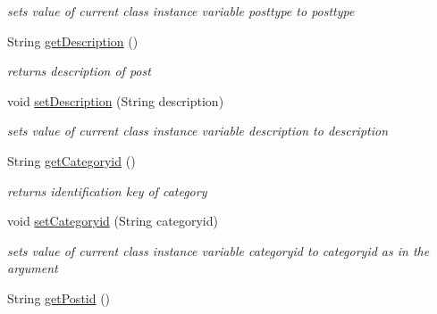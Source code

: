 \begin{DoxyCompactItemize}
\begin{DoxyCompactList}\small\item\em sets value of current class instance variable posttype to posttype \end{DoxyCompactList}\item 
\hypertarget{classcom_1_1example_1_1sel_1_1lostfound_1_1UserPost_ac335baf708ee63a07daeabb30804c4bb}{\-String \hyperlink{classcom_1_1example_1_1sel_1_1lostfound_1_1UserPost_ac335baf708ee63a07daeabb30804c4bb}{get\-Description} ()}\label{classcom_1_1example_1_1sel_1_1lostfound_1_1UserPost_ac335baf708ee63a07daeabb30804c4bb}

\begin{DoxyCompactList}\small\item\em returns description of post \end{DoxyCompactList}\item 
\hypertarget{classcom_1_1example_1_1sel_1_1lostfound_1_1UserPost_a4901987ba0f3cb6d4c84d542c8cbc282}{void \hyperlink{classcom_1_1example_1_1sel_1_1lostfound_1_1UserPost_a4901987ba0f3cb6d4c84d542c8cbc282}{set\-Description} (\-String description)}\label{classcom_1_1example_1_1sel_1_1lostfound_1_1UserPost_a4901987ba0f3cb6d4c84d542c8cbc282}

\begin{DoxyCompactList}\small\item\em sets value of current class instance variable description to description \end{DoxyCompactList}\item 
\hypertarget{classcom_1_1example_1_1sel_1_1lostfound_1_1UserPost_a635cbd223deabe14c6344476b9c0344c}{\-String \hyperlink{classcom_1_1example_1_1sel_1_1lostfound_1_1UserPost_a635cbd223deabe14c6344476b9c0344c}{get\-Categoryid} ()}\label{classcom_1_1example_1_1sel_1_1lostfound_1_1UserPost_a635cbd223deabe14c6344476b9c0344c}

\begin{DoxyCompactList}\small\item\em returns identification key of category \end{DoxyCompactList}\item 
\hypertarget{classcom_1_1example_1_1sel_1_1lostfound_1_1UserPost_a49a8d15ea95d8b9c9aa837c0bf8952c6}{void \hyperlink{classcom_1_1example_1_1sel_1_1lostfound_1_1UserPost_a49a8d15ea95d8b9c9aa837c0bf8952c6}{set\-Categoryid} (\-String categoryid)}\label{classcom_1_1example_1_1sel_1_1lostfound_1_1UserPost_a49a8d15ea95d8b9c9aa837c0bf8952c6}

\begin{DoxyCompactList}\small\item\em sets value of current class instance variable categoryid to categoryid as in the argument \end{DoxyCompactList}\item 
\hypertarget{classcom_1_1example_1_1sel_1_1lostfound_1_1UserPost_a02152ed8f7856d79945bb503fb0ad5ff}{\-String \hyperlink{classcom_1_1example_1_1sel_1_1lostfound_1_1UserPost_a02152ed8f7856d79945bb503fb0ad5ff}{get\-Postid} ()}\label{classcom_1_1example_1_1sel_1_1lostfound_1_1UserPost_a02152ed8f7856d79945bb503fb0ad5ff}


\end{DoxyCompactItemize}
